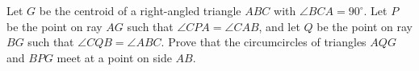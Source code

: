 Let $G$ be the centroid of a right-angled triangle $ABC$ with $\angle BCA = 90^\circ$. Let $P$ be the point on ray $AG$ such that $\angle CPA = \angle CAB$,  and let $Q$ be the point on ray $BG$ such that $\angle CQB = \angle ABC$. Prove that the circumcircles of triangles $AQG$ and $BPG$ meet at a point on side $AB$.